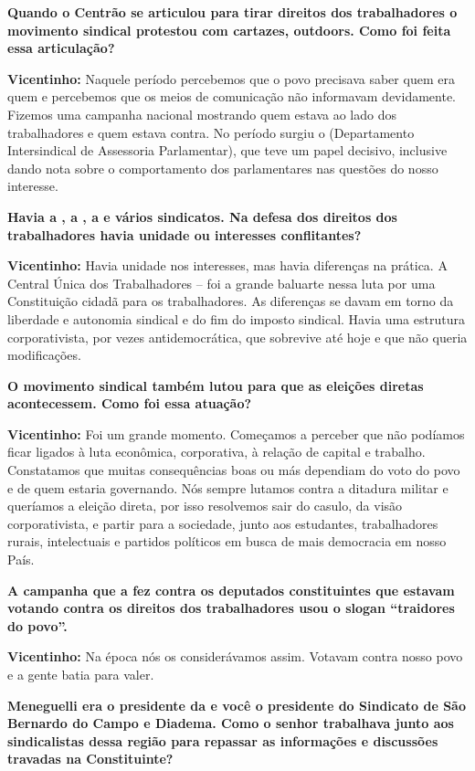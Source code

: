 \textbf{Quando o Centrão se articulou para tirar direitos dos
trabalhadores o movimento sindical protestou com cartazes, outdoors.
Como foi feita essa articulação?}

\textbf{Vicentinho:} Naquele período percebemos que o povo precisava
saber quem era quem e percebemos que os meios de comunicação não
informavam devidamente. Fizemos uma campanha nacional mostrando quem
estava ao lado dos trabalhadores e quem estava contra. No período surgiu
o  (Departamento Intersindical de Assessoria Parlamentar), que teve
um papel decisivo, inclusive dando nota sobre o comportamento dos
parlamentares nas questões do nosso interesse.

\textbf{Havia a , a , a  e vários sindicatos. Na defesa dos
direitos dos trabalhadores havia unidade ou interesses conflitantes?}

\textbf{Vicentinho:} Havia unidade nos interesses, mas havia diferenças
na prática. A Central Única dos Trabalhadores --  foi a grande
baluarte nessa luta por uma Constituição cidadã para os trabalhadores.
As diferenças se davam em torno da liberdade e autonomia sindical e do
fim do imposto sindical. Havia uma estrutura corporativista, por vezes
antidemocrática, que sobrevive até hoje e que não queria modificações.

\textbf{O movimento sindical também lutou para que as eleições diretas
acontecessem. Como foi essa atuação?}

\textbf{Vicentinho:} Foi um grande momento. Começamos a perceber que não
podíamos ficar ligados à luta econômica, corporativa, à relação de
capital e trabalho. Constatamos que muitas consequências boas ou más
dependiam do voto do povo e de quem estaria governando. Nós sempre
lutamos contra a ditadura militar e queríamos a eleição direta, por isso
resolvemos sair do casulo, da visão corporativista, e partir para a
sociedade, junto aos estudantes, trabalhadores rurais, intelectuais e
partidos políticos em busca de mais democracia em nosso País.

\textbf{A campanha que a  fez contra os deputados constituintes que
estavam votando contra os direitos dos trabalhadores usou o slogan
``traidores do povo''.}

\textbf{Vicentinho:} Na época nós os considerávamos assim. Votavam
contra nosso povo e a gente batia para valer.

\textbf{Meneguelli era o presidente da  e você o presidente do
Sindicato de São Bernardo do Campo e Diadema. Como o senhor trabalhava
junto aos sindicalistas dessa região para repassar as informações e
discussões travadas na Constituinte?}

